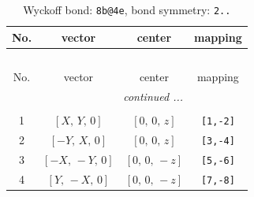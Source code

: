 \documentclass[fleqn,8pt]{jsarticle}
\begin{document}
\renewcommand{\arraystretch}{1.2}
\begin{longtable}{cccc}
\caption{Wyckoff bond: {\tt 8b@4e}, bond symmetry: {\tt 2..}}
 \\
 \hline \hline
No. & vector & center & mapping \\ \hline \endfirsthead

\multicolumn{3}{l}{\tablename\ \thetable{}} \\
 \hline \hline
No. & vector & center & mapping \\ \hline \endhead

 \hline \hline
\multicolumn{3}{r}{\footnotesize\it continued ...} \\ \endfoot

 \hline \hline
\multicolumn{3}{r}{} \\ \endlastfoot

1 & $\left[ X,\, Y,\, 0 \right]$ & $\left[ 0,\, 0,\, z \right]$ & {\tt [1,-2]} \\ \hline
2 & $\left[ - Y,\, X,\, 0 \right]$ & $\left[ 0,\, 0,\, z \right]$ & {\tt [3,-4]} \\ \hline
3 & $\left[ - X,\, - Y,\, 0 \right]$ & $\left[ 0,\, 0,\, - z \right]$ & {\tt [5,-6]} \\ \hline
4 & $\left[ Y,\, - X,\, 0 \right]$ & $\left[ 0,\, 0,\, - z \right]$ & {\tt [7,-8]} \\
\end{longtable}
\renewcommand{\arraystretch}{1.2}
\end{document}
